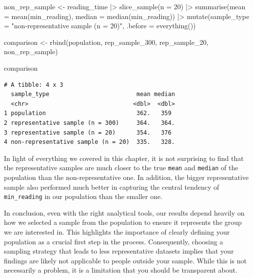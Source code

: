 \documentclass[
  letterpaper,
  DIV=11,
  numbers=noendperiod]{scrreprt}
\newenvironment{Shaded}{\begin{snugshade}}{\end{snugshade}}
\newcommand{\AttributeTok}[1]{\textcolor[rgb]{0.40,0.45,0.13}{#1}}
\newcommand{\DecValTok}[1]{\textcolor[rgb]{0.68,0.00,0.00}{#1}}
\newcommand{\FunctionTok}[1]{\textcolor[rgb]{0.28,0.35,0.67}{#1}}
\newcommand{\NormalTok}[1]{\textcolor[rgb]{0.00,0.23,0.31}{#1}}
\newcommand{\OtherTok}[1]{\textcolor[rgb]{0.00,0.23,0.31}{#1}}
\newcommand{\SpecialCharTok}[1]{\textcolor[rgb]{0.37,0.37,0.37}{#1}}
\newcommand{\StringTok}[1]{\textcolor[rgb]{0.13,0.47,0.30}{#1}}
\begin{document}
\begin{Shaded}
\begin{Highlighting}[]
\NormalTok{non\_rep\_sample }\OtherTok{\textless{}{-}}
\NormalTok{  reading\_time }\SpecialCharTok{|\textgreater{}}
  \FunctionTok{slice\_sample}\NormalTok{(}\AttributeTok{n =} \DecValTok{20}\NormalTok{) }\SpecialCharTok{|\textgreater{}}
  \FunctionTok{summarise}\NormalTok{(}\AttributeTok{mean =} \FunctionTok{mean}\NormalTok{(min\_reading),}
            \AttributeTok{median =} \FunctionTok{median}\NormalTok{(min\_reading)) }\SpecialCharTok{|\textgreater{}}
  \FunctionTok{mutate}\NormalTok{(}\AttributeTok{sample\_type =} \StringTok{"non{-}representative sample (n = 20)"}\NormalTok{,}
         \AttributeTok{.before =} \FunctionTok{everything}\NormalTok{())}

\NormalTok{comparison }\OtherTok{\textless{}{-}} \FunctionTok{rbind}\NormalTok{(population, rep\_sample\_300,}
\NormalTok{                    rep\_sample\_20, non\_rep\_sample)}

\NormalTok{comparison}
\end{Highlighting}
\end{Shaded}

\begin{verbatim}
# A tibble: 4 x 3
  sample_type                         mean median
  <chr>                              <dbl>  <dbl>
1 population                          362.   359 
2 representative sample (n = 300)     364.   364.
3 representative sample (n = 20)      354.   376 
4 non-representative sample (n = 20)  335.   328.
\end{verbatim}

In light of everything we covered in this chapter, it is not surprising
to find that the representative samples are much closer to the true
\texttt{mean} and \texttt{median} of the population than the
non-representative one. In addition, the bigger representative sample
also performed much better in capturing the central tendency of
\texttt{min\_reading} in our population than the smaller one.

In conclusion, even with the right analytical tools, our results depend
heavily on how we selected a sample from the population to ensure it
represents the group we are interested in. This highlights the
importance of clearly defining your population as a crucial first step
in the process. Consequently, choosing a sampling strategy that leads to
less representative datasets implies that your findings are likely not
applicable to people outside your sample. While this is not necessarily
a problem, it is a limitation that you should be transparent about.
\end{document}
